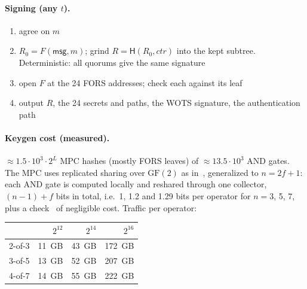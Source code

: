 \documentclass[11pt]{article}
\newcommand{\hash}{\mathsf{H}}
\begin{document}
\paragraph{Signing (any $t$).}
\begin{enumerate}
  \item agree on $m$
  \item $R_0=F(\mathsf{msg},m)$; grind $R=\hash(R_0,\mathit{ctr})$ into the kept subtree. Deterministic: all
        quorums give the same signature
  \item open $F$ at the 24 FORS addresses; check each against its leaf
  \item output $R$, the 24 secrets and paths, the WOTS signature, the authentication path
\end{enumerate}

\paragraph{Keygen cost (measured).} $\approx1.5\cdot10^3\cdot2^L$ MPC hashes (mostly FORS leaves) of
$\approx13.5\cdot10^3$ AND gates. The MPC uses replicated sharing over $\mathrm{GF}(2)$ as
in~\cite{BGIN19}, generalized to $n=2f+1$: each AND gate is computed locally and reshared through one
collector, $(n-1)+f$ bits in total, i.e.\ 1, 1.2 and 1.29 bits per operator for $n=3$, 5, 7, plus a
check~\cite{GS20} of negligible cost. Traffic per operator:

\begin{center}
\begin{tabular}{lrrr}
  \toprule
  & $2^{12}$ & $2^{14}$ & $2^{16}$ \\
  \midrule
  2-of-3 & 11~GB & 43~GB & 172~GB \\
  3-of-5 & 13~GB & 52~GB & 207~GB \\
  4-of-7 & 14~GB & 55~GB & 222~GB \\
  \bottomrule
\end{tabular}
\end{center}
\end{document}
